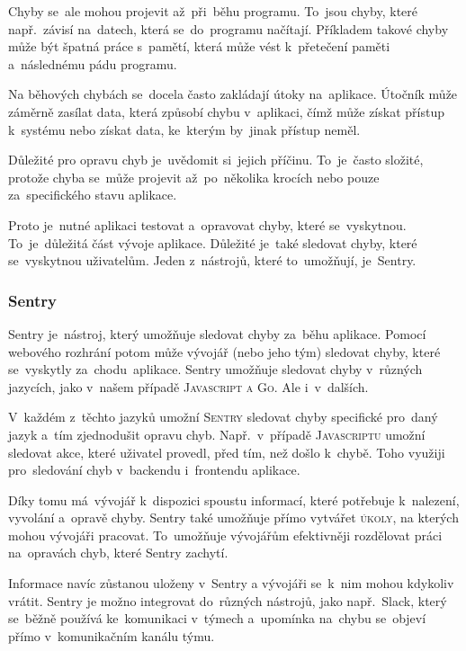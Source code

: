 \documentclass[14pt,a4paper]{article}
\begin{document}
            Chyby se~ale mohou projevit až~při~běhu programu. To~jsou chyby, které např.~závisí na~datech, která se~do~programu načítají.
            Příkladem takové chyby může být špatná práce s~pamětí, která může vést k~přetečení paměti a~následnému pádu programu.

            Na běhových chybách se~docela často zakládají útoky na~aplikace. Útočník může záměrně zasílat data, která způsobí chybu v~aplikaci,
            čímž může získat přístup k~systému nebo získat data, ke~kterým by~jinak přístup neměl.

            Důležité pro opravu chyb je~uvědomit si~jejich příčinu. To~je~často složité, protože chyba se~může projevit až~po~několika krocích nebo pouze za~specifického stavu aplikace.

            Proto je~nutné aplikaci testovat a~opravovat chyby, které se~vyskytnou. To~je~důležitá část vývoje aplikace. Důležité je~také sledovat
            chyby, které se~vyskytnou uživatelům. Jeden z~nástrojů, které to~umožňují, je~Sentry.

            \subsubsection{Sentry}
            Sentry je~nástroj, který umožňuje sledovat chyby za~běhu aplikace.
            Pomocí webového rozhrání potom může vývojář (nebo jeho tým) sledovat chyby, které se~vyskytly za~chodu~aplikace.
            Sentry umožňuje sledovat chyby v~různých jazycích, jako v~našem případě \textsc{Javascript a Go}. Ale i~v~dalších.


            V~každém z~těchto jazyků umožní \textsc{Sentry} sledovat chyby specifické pro~daný jazyk a~tím zjednodušit opravu chyb.
            Např.~v~případě \textsc{Javascriptu} umožní sledovat akce, které uživatel provedl, před tím, než došlo k~chybě. 
            Toho využiji pro~sledování chyb v~backendu i~frontendu aplikace.

            Díky tomu má~vývojář k~dispozici spoustu informací, které potřebuje k~nalezení, vyvolání a~opravě chyby.
            Sentry také umožňuje přímo vytvářet \textsc{úkoly}, na kterých mohou vývojáři pracovat.
            To~umožňuje vývojářům efektivněji rozdělovat práci na~opravách chyb, které Sentry zachytí.

            Informace navíc zůstanou uloženy v~Sentry a vývojáři se~k~nim mohou kdykoliv vrátit.
            Sentry je možno integrovat do~různých nástrojů, jako např.~Slack, který se~běžně používá ke~komunikaci v~týmech
            a~upomínka na~chybu se~objeví přímo v~komunikačním kanálu týmu.
	
\end{document}
